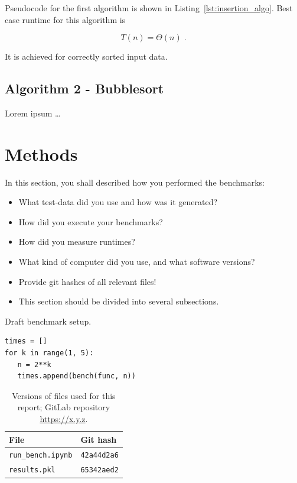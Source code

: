 \documentclass[sigconf, nonacm, natbib, screen, balance=False]{acmart}
\begin{document}
Pseudocode for the first algorithm is shown in
Listing~\ref{lst:insertion_algo}. Best case runtime for this algorithm
is

\begin{equation}
  T(n) = \Theta(n) \;.  \label{eq:ins_sort_best}
\end{equation}

It is achieved for correctly sorted input data.

\subsection{Algorithm 2 - Bubblesort}\label{sec:algo2}

Lorem ipsum \dots


\section{Methods}\label{sec:methods}

In this section, you shall described how you performed the
benchmarks:
\begin{itemize}
\item What test-data did you use and how was it generated?
\item How did you execute your benchmarks?
\item How did you measure runtimes?
\item What kind of computer did you use, and what software versions?
\item Provide git hashes of all relevant files!
\item This section should be divided into several subsections.
\end{itemize}

\begin{listing}
  \caption{Draft benchmark setup.}
  \label{lst:bench_setup}
  \begin{lstlisting}
times = []
for k in range(1, 5):
   n = 2**k
   times.append(bench(func, n))
  \end{lstlisting}
\end{listing}

\begin{table}
  \caption{Versions of files used for this report; GitLab repository
    \url{https://x.y.z}.}
  \label{tab:hashes}
  \begin{tabular}{ll}
    \hline
    File & Git hash \\\hline
    \verb!run_bench.ipynb! & \verb!42a44d2a6! \\
    \verb!results.pkl! & \verb!65342aed2! \\\hline
  \end{tabular}
\end{table}
\end{document}

